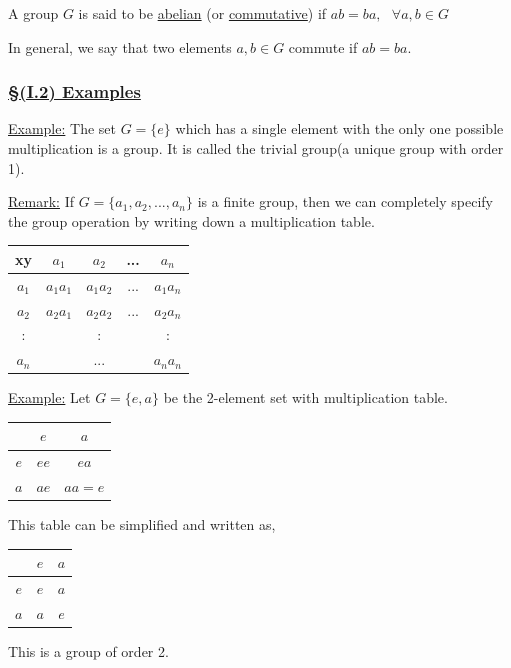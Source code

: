 \documentclass{article}
\theoremstyle{definition}
\begin{document}
\begin{tcolorbox} [title= Definition:, colback=black!10!white]
    A group $G$ is said to be \underline{abelian} (or \underline{commutative}) if $ab=ba,\ \ \ \forall a,b\in G$
\end{tcolorbox}
In general, we say that two elements $a,b\in G$ commute if $ab=ba$.

\subsubsection*{\underline{\S (I.2) Examples}}
\noindent\underline{Example:} The set $G=\{e\}$ which has a single element with the only one possible multiplication is a group. It is called the trivial group(a unique group with order 1).

\noindent\underline{Remark:} If $G=\{a_1,a_2,...,a_n\}$ is a finite group, then we can completely specify the group operation by writing down a multiplication table.
\begin{table}[H]
    \centering
    \begin{tabular}{c|cccc}
        xy & $a_1$ & $a_2$ & ...& $a_n$\\
        \hline
        $a_1$ & $a_1a_1$ & $a_1a_2$ & ...& $a_1a_n$\\
        $a_2$ & $a_2a_1$ & $a_2a_2$ & ...&$a_2a_n$\\
        : & & :& &:\\
        $a_n$&&...&& $a_na_n$
    \end{tabular}
\end{table}

\noindent\underline{Example:} Let $G=\{e,a\}$ be the 2-element set with multiplication table.
\begin{table}[H]
    \centering
    \begin{tabular}{c|cc}
        & $e$ & $a$\\
        \hline
        $e$ & $ee$ & $ea$\\
        $a$ & $ae$ & $aa=e$
    \end{tabular}
\end{table}
This table can be simplified and written as,
\begin{table}[H]
    \centering
    \begin{tabular}{c|cc}
        & $e$ & $a$\\
        \hline
        $e$ & $e$ & $a$\\
        $a$ & $a$ & $e$
    \end{tabular}
\end{table}
This is a group of order 2.
\end{document}
